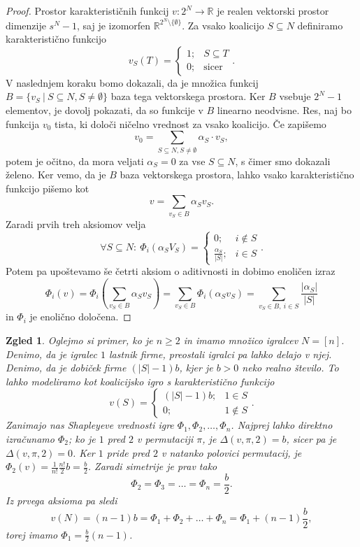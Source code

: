\documentclass[10pt, a4paper]{article}
\newtheorem{zgled}[izr]{Zgled}
\newenvironment{noticeC}{%
  \tcolorbox[%
  notitle,
  empty,
  enhanced,  %
  breakable,
  coltext=black, 
  fontupper=\rmfamily,
  parbox=false,
  noparskip,
  sharp corners,
  boxrule=-1pt,  %
  frame hidden,
  left=7pt,  %
  right=7pt,
  top=5pt,
  bottom=5pt,
  before skip=2.5ex plus 2pt,
  after skip=2.5ex plus 2pt,
  overlay unbroken and last={%
  },
  ]}
{\endtcolorbox}
\newenvironment{dokaz}%
  {\begin{noticeC}\begin{proof}}%
  {\end{proof}\end{noticeC}}
\newcommand{\R}{\mathbb {R}}
\begin{document}
\begin{dokaz}
  Prostor karakterističnih funkcij $v: 2^N \to \R$ je realen vektorski prostor dimenzije $s^N - 1$,
  saj je izomorfen $\R^{2^N \setminus \{\emptyset\}}$.
  Za vsako koalicijo $S \subseteq N$ definiramo karakteristično funkcijo
  $$v_S (T) = \begin{cases}
    1;& S \subseteq T\\
    0;& \text{sicer}
  \end{cases}.$$
  V naslednjem koraku bomo dokazali, da je množica funkcij 
  $B = \{v_S\ |\ S \subseteq N, S \neq \emptyset\}$ baza tega vektorskega prostora.
  Ker $B$ vsebuje $2^N - 1$ elementov, je dovolj pokazati, da so funkcije v $B$ linearno neodvisne.
  Res, naj bo funkcija $v_0$ tista, ki določi ničelno vrednost za vsako koalicijo.
  Če zapišemo 
  $$v_0 = \sum_{S \subseteq N, S \neq \emptyset} \alpha_S \cdot v_S,$$
  potem je očitno, da mora veljati $\alpha_S = 0$ za vse $S \subseteq N$,
  s čimer smo dokazali želeno. Ker vemo, da je $B$ baza vektorskega prostora,
  lahko vsako karakteristično funkcijo pišemo kot 
  $$v = \sum_{v_S \in B} \alpha_S v_S.$$
  Zaradi prvih treh aksiomov velja 
  $$\forall S \subseteq N:\ \Phi_i (\alpha_S V_S) = \begin{cases}
    0;& i \notin S\\
    \frac{\alpha_S}{|S|};& i \in S
  \end{cases}.$$
  Potem pa upoštevamo še četrti aksiom o aditivnosti in dobimo enoličen izraz 
  $$\Phi_i (v) = \Phi_i \left(\sum_{v_S \in B} \alpha_S v_S\right) = \sum_{v_S \in B} \Phi_i (\alpha_S v_S) = \sum_{v_S \in B,\ i \in S} \frac{|\alpha_S|}{|S|}$$
  in $\Phi_i$ je enolično določena.
\end{dokaz}

\begin{zgled}
  Oglejmo si primer, ko je $n \geq 2$ in imamo množico igralcev $N = [n]$.
  Denimo, da je igralec $1$ lastnik firme, preostali igralci pa lahko delajo v njej.
  Denimo, da je dobiček firme $(|S| - 1)b$, kjer je $b > 0$ neko realno število.
  To lahko modeliramo kot koalicijsko igro s karakteristično funkcijo 
  $$v(S) = \begin{cases}
    (|S| - 1)b;& 1 \in S\\
    0;& 1 \notin S
  \end{cases}.$$
  Zanimajo nas Shapleyeve vrednosti igre $\Phi_1, \Phi_2, \dots, \Phi_n$.
  Najprej lahko direktno izračunamo $\Phi_2$; ko je $1$ pred $2$ v permutaciji $\pi$, je $\Delta(v, \pi, 2) = b$,
  sicer pa je $\Delta(v, \pi, 2) = 0$.
  Ker $1$ pride pred $2$ v natanko polovici permutacij, je $\Phi_2 (v) = \frac{1}{n!} \frac{n!}{2} b = \frac{b}{2}$.
  Zaradi simetrije je prav tako 
  $$\Phi_2 = \Phi_3 = \dots = \Phi_n = \frac{b}{2}.$$
  Iz prvega aksioma pa sledi
  $$v(N) = (n - 1)b = \Phi_1 + \Phi_2 + \dots + \Phi_n = \Phi_1 + (n - 1)\frac{b}{2},$$
  torej imamo $\Phi_1 = \frac{b}{2} (n - 1)$.
\end{zgled}
\end{document}
